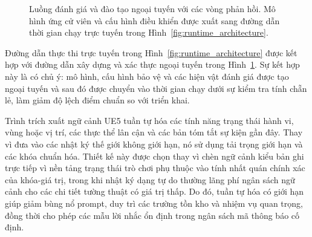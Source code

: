 ﻿\documentclass[a4paper,12pt]{article}
\begin{document}
\begin{figure}[t]
\centering
{}
\caption{Luồng đánh giá và đào tạo ngoại tuyến với các vòng phản hồi. Mô hình ứng cử viên và cấu hình điều khiển được xuất sang đường dẫn thời gian chạy trực tuyến trong Hình~\ref{fig:runtime_architecture}.}
\label{fig:offline_pipeline}
\end{figure}

Đường dẫn thực thi trực tuyến trong Hình~\ref{fig:runtime_architecture} được kết hợp với đường dẫn xây dựng và xác thực ngoại tuyến trong Hình~\ref{fig:offline_pipeline}. Sự kết hợp này là có chủ ý: mô hình, cấu hình bảo vệ và các hiện vật đánh giá được tạo ngoại tuyến và sau đó được chuyển vào thời gian chạy dưới sự kiểm tra tính chẵn lẻ, làm giảm độ lệch điểm chuẩn so với triển khai.

Trình trích xuất ngữ cảnh UE5 tuần tự hóa các tính năng trạng thái hành vi, vùng hoặc vị trí, các thực thể lân cận và các bản tóm tắt sự kiện gần đây. Thay vì đưa vào các nhật ký thế giới không giới hạn, nó sử dụng tải trọng giới hạn và các khóa chuẩn hóa. Thiết kế này được chọn thay vì chèn ngữ cảnh kiểu bản ghi trực tiếp vì nền tảng trạng thái trò chơi phụ thuộc vào tính nhất quán chính xác của khóa-giá trị, trong khi nhật ký dạng tự do thường lãng phí ngân sách ngữ cảnh cho các chi tiết tường thuật có giá trị thấp. Do đó, tuần tự hóa có giới hạn giúp giảm bùng nổ prompt, duy trì các trường tồn kho và nhiệm vụ quan trọng, đồng thời cho phép các mẫu lời nhắc ổn định trong ngân sách mã thông báo cố định.
\end{document}
